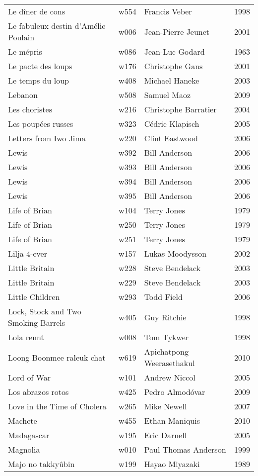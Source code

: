 \documentclass{article}
\begin{document}
\begin {center}
\begin{longtable}{p{10cm} l l l}
Le dîner de cons & w554 & Francis Veber & 1998 \\
Le fabuleux destin d'Amélie Poulain & w006 & Jean-Pierre Jeunet & 2001 \\
Le mépris & w086 & Jean-Luc Godard & 1963 \\
Le pacte des loups & w176 & Christophe Gans & 2001 \\
Le temps du loup & w408 & Michael Haneke & 2003 \\
Lebanon & w508 & Samuel Maoz & 2009 \\
Les choristes & w216 & Christophe Barratier & 2004 \\
Les poupées russes & w323 & Cédric Klapisch & 2005 \\
Letters from Iwo Jima & w220 & Clint Eastwood & 2006 \\
Lewis & w392 & Bill Anderson & 2006 \\
Lewis & w393 & Bill Anderson & 2006 \\
Lewis & w394 & Bill Anderson & 2006 \\
Lewis & w395 & Bill Anderson & 2006 \\
Life of Brian & w104 & Terry Jones & 1979 \\
Life of Brian & w250 & Terry Jones & 1979 \\
Life of Brian & w251 & Terry Jones & 1979 \\
Lilja 4-ever & w157 & Lukas Moodysson & 2002 \\
Little Britain & w228 & Steve Bendelack & 2003 \\
Little Britain & w229 & Steve Bendelack & 2003 \\
Little Children & w293 & Todd Field & 2006 \\
Lock, Stock and Two Smoking Barrels & w405 & Guy Ritchie & 1998 \\
Lola rennt & w008 & Tom Tykwer & 1998 \\
Loong Boonmee raleuk chat & w619 & Apichatpong Weerasethakul & 2010 \\
Lord of War & w101 & Andrew Niccol & 2005 \\
Los abrazos rotos & w425 & Pedro Almodóvar & 2009 \\
Love in the Time of Cholera & w265 & Mike Newell & 2007 \\
Machete & w455 & Ethan Maniquis & 2010 \\
Madagascar & w195 & Eric Darnell & 2005 \\
Magnolia & w010 & Paul Thomas Anderson & 1999 \\
Majo no takkyûbin & w199 & Hayao Miyazaki & 1989 \\

\end{longtable}
\end{center}
\end{document}
